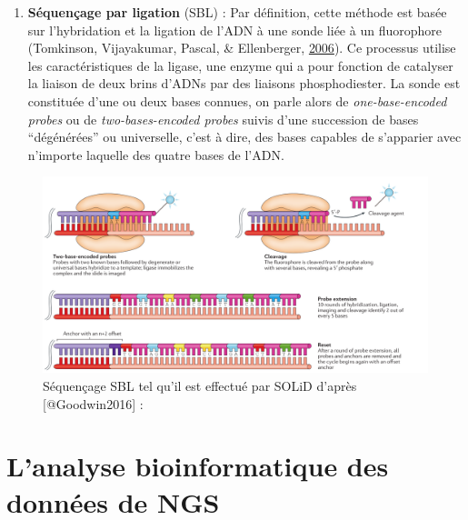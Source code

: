 \documentclass[12pt,twoside]{reedthesis}
\providecommand{\tightlist}{%
  \setlength{\itemsep}{0pt}\setlength{\parskip}{0pt}}
\theoremstyle{definition}
\theoremstyle{definition}
\theoremstyle{remark}
\begin{document}
  \newpage
  
  \begin{enumerate}
  \def\labelenumi{\arabic{enumi}.}
  \setcounter{enumi}{1}
  \tightlist
  \item
    \textbf{Séquençage par ligation} (SBL) : Par définition, cette méthode
    est basée sur l'hybridation et la ligation de l'ADN à une sonde liée à
    un fluorophore (Tomkinson, Vijayakumar, Pascal, \& Ellenberger,
    \protect\hyperlink{ref-Tomkinson2006}{2006}). Ce processus utilise les
    caractéristiques de la ligase, une enzyme qui a pour fonction de
    catalyser la liaison de deux brins d'ADNs par des liaisons
    phosphodiester. La sonde est constituée d'une ou deux bases connues,
    on parle alors de \emph{one-base-encoded probes} ou de
    \emph{two-bases-encoded probes} suivis d'une succession de bases
    ``dégénérées'' ou universelle, c'est à dire, des bases capables de
    s'apparier avec n'importe laquelle des quatre bases de l'ADN.
  \end{enumerate}
  
  \begin{figure}
  
  {\centering \includegraphics[scale=.26]{figure/SBL_seq_solid} 
  
  }
  
  \caption[Séquençage SBL tel qu'il est effectué par SOLiD]{Séquençage SBL tel qu'il est effectué par SOLiD d'après [@Goodwin2016] : }\label{fig:sblSeq}
  \end{figure}
  
  \newpage  
  
  \section{L'analyse bioinformatique des données de
  NGS}\label{lanalyse-bioinformatique-des-donnees-de-ngs}
  
\end{document}
